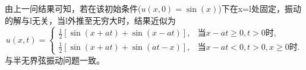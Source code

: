 \documentclass[10.5pt]{article}
\begin{document}
\subsection{}
由上一问结果可知，若在该初始条件($u(x,0)=\sin(x)$)下在x=l处固定，振动的解与l无关，当l外推至无穷大时，结果近似为$$u(x,t)=\begin{cases}
    \frac{1}{2}\left[\sin(x+at)+\sin(x-at)\right],&\text{当}x-at\geqslant 0,t>0\text{时},\\
    \frac{1}{2}\left[\sin(x+at)+\sin(at-x)\right],&\text{当}x-at< 0,t>0,x\geqslant 0\text{时}.
\end{cases}$$\indent
与半无界弦振动问题一致。
\end{document}
